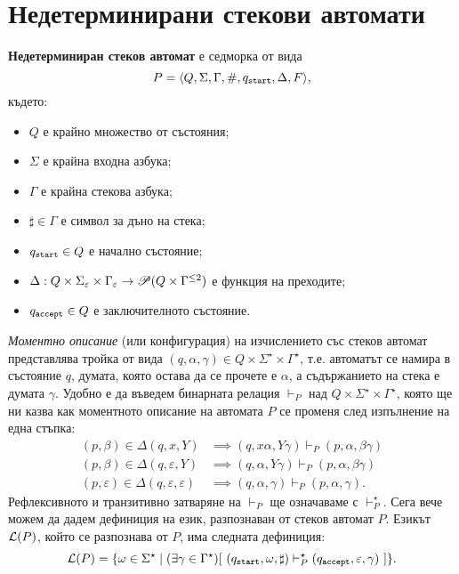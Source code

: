 \section{Недетерминирани стекови автомати}

{\bf Недетерминиран стеков автомат} е седморка от вида
\[P = \langle{Q,\Sigma,\Gamma,\#,q_{\texttt{start}},\Delta,F}\rangle,\] където:
\begin{itemize}
\item
  $Q$ е крайно множество от състояния;
\item  
  $\Sigma$ е крайна входна азбука;
\item
  $\Gamma$ е крайна стекова азбука;
\item
  $\sharp \in \Gamma$ е символ за дъно на стека;
\item
  $q_{\texttt{start}} \in Q$ е начално състояние;
\item
  $\Delta:Q\times\Sigma_\varepsilon\times \Gamma_\varepsilon \rightarrow \mathscr{P}(Q\times\Gamma^{\leq 2})$ 
  е функция на преходите;    
\item
  $q_{\texttt{accept}} \in Q$ е заключителното състояние.
\end{itemize}

{\em Моментно описание} (или конфигурация) на изчислението със стеков автомат представлява тройка от вида $(q,\alpha,\gamma) \in Q\times\Sigma^\star\times\Gamma^\star$,
т.е. автоматът се намира в състояние $q$, думата, която остава да се прочете е $\alpha$,
а съдържанието на стека е думата $\gamma$.
Удобно е да въведем бинарната релация $\vdash_P$ над $Q\times\Sigma^\star\times\Gamma^\star$,
която ще ни казва как моментното описание на автомата $P$ се променя след изпълнение на една стъпка:
\begin{align*}
  (p,\beta) \in \Delta(q,x,Y) & \implies (q,x\alpha,Y\gamma) \vdash_P (p,\alpha,\beta\gamma)\\
  (p,\beta) \in \Delta(q,\varepsilon,Y) & \implies (q,\alpha,Y\gamma) \vdash_P (p,\alpha,\beta\gamma)\\
  (p,\varepsilon) \in \Delta(q,\varepsilon,\varepsilon) & \implies (q,\alpha,\gamma) \vdash_P (p,\alpha,\gamma).
\end{align*}
Рефлексивното и транзитивно затваряне на $\vdash_P$ ще означаваме с $\vdash^\star_P$.
Сега вече можем да дадем дефиниция на език, разпознаван от стеков автомат $P$.
Езикът $\mathcal{L}(P)$, който се разпознава от $P$, има следната дефиниция:
\[\L(P) = \{\omega \in \Sigma^\star \mid (\exists \gamma \in \Gamma^\star)[\ (\qstart,\omega,\sharp) \vdash^\star_P (\qaccept,\varepsilon,\gamma)\ ]\}.\]    

